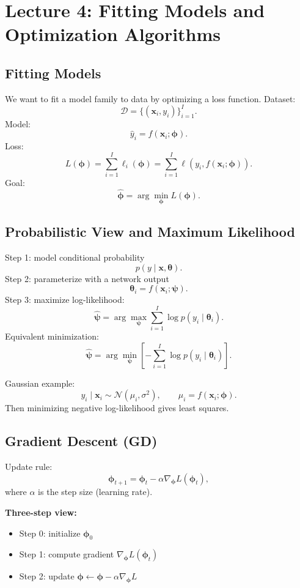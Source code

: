 \newpage
\section{Lecture 4: Fitting Models and Optimization Algorithms}

\subsection{Fitting Models}
We want to fit a model family to data by optimizing a loss function.
Dataset:
\[
\mathcal{D}=\{(\mathbf{x}_i,y_i)\}_{i=1}^{I}.
\]
Model:
\[
\hat{y}_i=f(\mathbf{x}_i;\boldsymbol{\phi}).
\]
Loss:
\[
L(\boldsymbol{\phi})=\sum_{i=1}^{I}\ell_i(\boldsymbol{\phi})
=\sum_{i=1}^{I}\ell\!\left(y_i,f(\mathbf{x}_i;\boldsymbol{\phi})\right).
\]
Goal:
\[
\hat{\boldsymbol{\phi}}=\arg\min_{\boldsymbol{\phi}}L(\boldsymbol{\phi}).
\]

\subsection{Probabilistic View and Maximum Likelihood}
Step 1: model conditional probability
\[
p(y\mid \mathbf{x},\boldsymbol{\theta}).
\]
Step 2: parameterize with a network output
\[
\boldsymbol{\theta}_i = f(\mathbf{x}_i;\boldsymbol{\psi}).
\]
Step 3: maximize log-likelihood:
\[
\hat{\boldsymbol{\psi}}
=
\arg\max_{\boldsymbol{\psi}}
\sum_{i=1}^{I}\log p(y_i\mid \boldsymbol{\theta}_i).
\]
Equivalent minimization:
\[
\hat{\boldsymbol{\psi}}
=
\arg\min_{\boldsymbol{\psi}}
\left[-\sum_{i=1}^{I}\log p(y_i\mid \boldsymbol{\theta}_i)\right].
\]

Gaussian example:
\[
y_i\mid \mathbf{x}_i \sim \mathcal{N}\!\left(\mu_i,\sigma^2\right),
\qquad
\mu_i=f(\mathbf{x}_i;\boldsymbol{\phi}).
\]
Then minimizing negative log-likelihood gives least squares.

\subsection{Gradient Descent (GD)}
Update rule:
\[
\boldsymbol{\phi}_{t+1}
=
\boldsymbol{\phi}_t
-\alpha\nabla_{\boldsymbol{\phi}}L(\boldsymbol{\phi}_t),
\]
where $\alpha$ is the step size (learning rate).

\textbf{Three-step view:}
\begin{itemize}
    \item Step 0: initialize $\boldsymbol{\phi}_0$
    \item Step 1: compute gradient $\nabla_{\boldsymbol{\phi}}L(\boldsymbol{\phi}_t)$
    \item Step 2: update $\boldsymbol{\phi}\leftarrow \boldsymbol{\phi}-\alpha\nabla_{\boldsymbol{\phi}}L$
\end{itemize}

